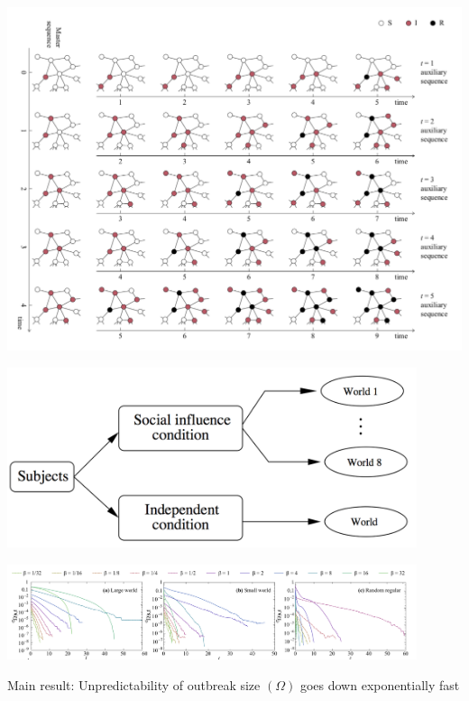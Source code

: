 \documentclass[aspectratio=169]{beamer}
\begin{document}
\begin{frame}

\begin{center}
\includegraphics[height = 0.9\textheight]{figures/holme_time_2015_fig1}
\end{center}

\end{frame}
\begin{frame}

\begin{center}
\includegraphics[width = 0.9\textwidth]{figures/musiclab_exp_design}
\end{center}

\end{frame}
\begin{frame}

\begin{center}
\includegraphics[width = 0.9\textwidth]{figures/holme_time_2015_fig3_toprow}
\end{center}

\vfill
Main result: Unpredictability of outbreak size $(\Omega)$ goes down exponentially fast
\end{frame}
\end{document}
